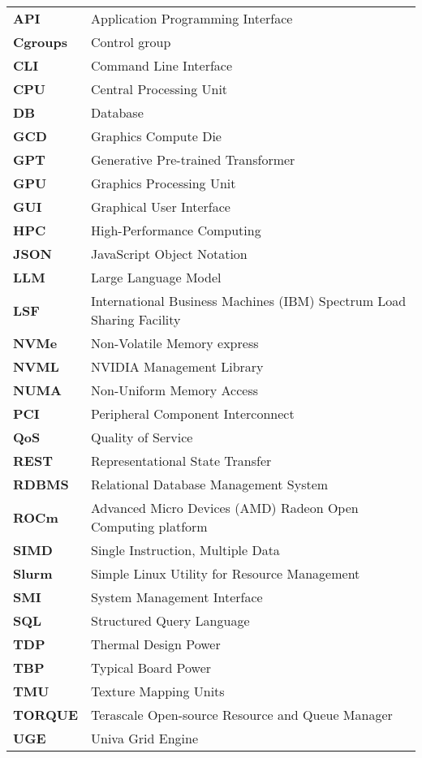 \begin{tabular}{ll}
\textbf{API} & Application Programming Interface \\
\textbf{Cgroups} & Control group \\
\textbf{CLI} & Command Line Interface \\
\textbf{CPU} & Central Processing Unit \\
\textbf{DB} & Database \\
\textbf{GCD} & Graphics Compute Die \\
\textbf{GPT} & Generative Pre-trained Transformer \\
\textbf{GPU} & Graphics Processing Unit \\
\textbf{GUI} & Graphical User Interface \\
\textbf{HPC} & High-Performance Computing \\
\textbf{JSON} & JavaScript Object Notation \\
\textbf{LLM} & Large Language Model \\
\textbf{LSF} & International Business Machines (IBM) Spectrum Load Sharing Facility \\
\textbf{NVMe} & Non-Volatile Memory express \\
\textbf{NVML} & NVIDIA Management Library \\
\textbf{NUMA} & Non-Uniform Memory Access \\
\textbf{PCI} & Peripheral Component Interconnect \\
\textbf{QoS} & Quality of Service \\
\textbf{REST} & Representational State Transfer \\
\textbf{RDBMS} & Relational Database Management System \\
\textbf{ROCm} & Advanced Micro Devices (AMD) Radeon Open Computing platform \\
\textbf{SIMD} & Single Instruction, Multiple Data \\
\textbf{Slurm} & Simple Linux Utility for Resource Management \\
\textbf{SMI} & System Management Interface \\
\textbf{SQL} & Structured Query Language \\
\textbf{TDP} & Thermal Design Power \\
\textbf{TBP} & Typical Board Power \\
\textbf{TMU} & Texture Mapping Units \\
\textbf{TORQUE} & Terascale Open-source Resource and Queue Manager \\
\textbf{UGE} & Univa Grid Engine \\
\end{tabular}
